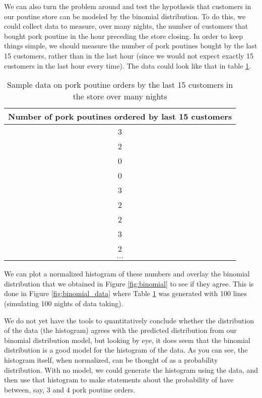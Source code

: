 
We can also turn the problem around and test the hypothesis that customers in our poutine store can be modeled by the binomial distribution. To do this, we could collect data to measure, over many nights, the number of customers that bought pork poutine in the hour preceding the store closing. In order to keep things simple, we should measure the number of pork poutines bought by the last 15 customers, rather than in the last hour (since we would not expect exactly 15 customers in the last hour every time). The data could look like that in table \ref{tab:poutineOrders}.
\begin{table}[h!]
\center
\begin{tabular}{|c|}
\hline \textbf{Number of pork poutines ordered by last 15 customers} \\
\hline
3\\
\hline
2\\
\hline
0\\
\hline
0\\
\hline
3\\
\hline
2\\
\hline
2\\
\hline
3\\
\hline
2\\
\hline
 $\dots$ \\
 \hline
\end{tabular}
\caption{\label{tab:poutineOrders} Sample data on pork poutine orders by the last 15 customers in the store over many nights}
\end{table} 

We can plot a normalized histogram of these numbers and overlay the binomial distribution that we obtained in Figure \ref{fig:binomial} to see if they agree. This is done in Figure \ref{fig:binomial_data} where Table \ref{tab:poutineOrders} was generated with 100 lines (simulating 100 nights of data taking).


We do not yet have the tools to quantitatively conclude whether the distribution of the data (the histogram) agrees with the predicted distribution from our binomial distribution model, but looking by eye, it does seem that the binomial distribution is a good model for the histogram of the data. As you can see, the histogram itself, when normalized, can be thought of as a probability distribution. With no model, we could generate the histogram using the data, and then use that histogram to make statements about the probability of have between, say, 3 and 4 pork poutine orders. 

